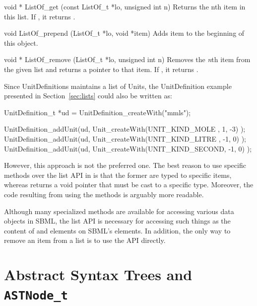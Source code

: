 \documentclass{sbmlmanual}
\begin{document}
\begin{methoddef}{void * ListOf\_get (const ListOf\_t *lo, unsigned int n)}
  Returns the nth item in this list.  If ,
  it returns .
\end{methoddef}


\begin{methoddef}{void ListOf\_prepend (ListOf\_t *lo, void *item)}
  Adds item to the beginning of this  object.
\end{methoddef}


\begin{methoddef}{void * ListOf\_remove (ListOf\_t *lo, unsigned int n)}
  Removes the \emph{n}th item from the given list and returns a pointer to
  that item.  If , it returns
  .
\end{methoddef}


Since UnitDefinitions maintains a list of Units, the UnitDefinition
example presented in Section~\ref{sec:lists} could also be written as:


\begin{cVerbatim}
  UnitDefinition_t *ud = UnitDefinition_createWith("mmls");
  
  UnitDefinition_addUnit(ud, Unit_createWith(UNIT_KIND_MOLE  ,  1, -3) );
  UnitDefinition_addUnit(ud, Unit_createWith(UNIT_KIND_LITRE , -1,  0) );
  UnitDefinition_addUnit(ud, Unit_createWith(UNIT_KIND_SECOND, -1,  0) );
\end{cVerbatim}


However, this approach is not the preferred one.  The best reason to use
specific  methods over the list API in \libsbml{} is
that the former are typed to specific items, whereas 
returns a void pointer that must be cast to a specific type.  Moreover, the
code resulting from using the  methods is arguably
more readable.

Although many specialized methods are available for accessing various data
objects in SBML, the list API is necessary for accessing such things as the
content of  and  elements on SBML's
 elements.  In addition, the only way to remove an item
from a list is to use the API directly.


\section{Abstract Syntax Trees and \texttt{ASTNode\_t}}
\label{app:ast}
\end{document}
